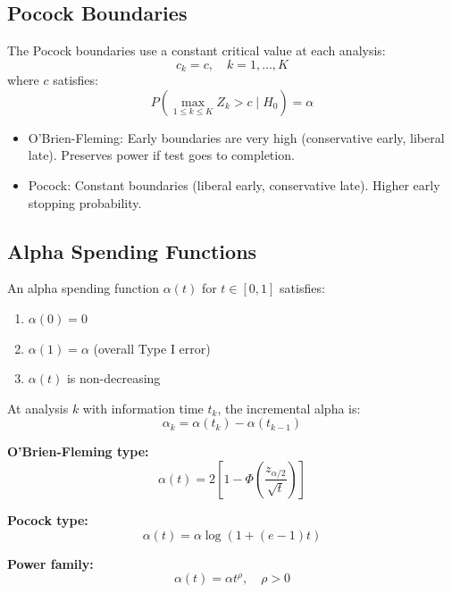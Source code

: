 \subsection{Pocock Boundaries}

\begin{theorem}
The Pocock boundaries use a constant critical value at each analysis:
\begin{equation}
c_k = c, \quad k = 1, \ldots, K
\end{equation}
where $c$ satisfies:
\begin{equation}
P\left(\max_{1 \leq k \leq K} Z_k > c \mid H_0\right) = \alpha
\end{equation}
\end{theorem}

\begin{remark}[Comparison]
\begin{itemize}
    \item O'Brien-Fleming: Early boundaries are very high (conservative early, liberal late). Preserves power if test goes to completion.
    \item Pocock: Constant boundaries (liberal early, conservative late). Higher early stopping probability.
\end{itemize}
\end{remark}

\subsection{Alpha Spending Functions}

\begin{definition}
An alpha spending function $\alpha(t)$ for $t \in [0, 1]$ satisfies:
\begin{enumerate}
    \item $\alpha(0) = 0$
    \item $\alpha(1) = \alpha$ (overall Type I error)
    \item $\alpha(t)$ is non-decreasing
\end{enumerate}

At analysis $k$ with information time $t_k$, the incremental alpha is:
\begin{equation}
\alpha_k = \alpha(t_k) - \alpha(t_{k-1})
\end{equation}
\end{definition}

\begin{example}
\textbf{O'Brien-Fleming type:}
\begin{equation}
\alpha(t) = 2\left[1 - \Phi\left(\frac{z_{\alpha/2}}{\sqrt{t}}\right)\right]
\end{equation}

\textbf{Pocock type:}
\begin{equation}
\alpha(t) = \alpha \log(1 + (e-1)t)
\end{equation}

\textbf{Power family:}
\begin{equation}
\alpha(t) = \alpha t^\rho, \quad \rho > 0
\end{equation}
\end{example}

